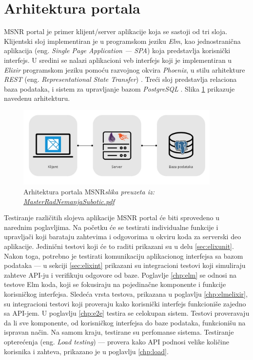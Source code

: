 \documentclass[12pt,oneside]{memoir}
\begin{document}
\section{Arhitektura portala}
\par MSNR portal je primer klijent/server aplikacije koja se sastoji od tri sloja. Klijentski sloj implementiran je u programskom jeziku \emph{Elm}, kao jednostranična aplikacija (eng. \emph{Single Page Application --- SPA}) koja predstavlja korisnički interfejs. U sredini se nalazi aplikacioni veb interfejs koji je implementiran u \emph{Elixir} programskom jeziku pomoću razvojnog okvira \emph{Phoenix}, u stilu arhitekture \emph{REST} (eng. \emph{Representational State Transfer}) \cite{rest}. Treći sloj predstavlja relaciona baza podataka, i sistem za upravljanje bazom \emph{PostgreSQL} \cite{postgre}. Slika \ref{fig:msnr-arch} prikazuje navedenu arhitekturu. 

\begin{figure}[!ht]
  \centering
  \label{fig:msnr-arch}
  \includegraphics[width=0.9\textwidth]{msnr-arch.png}
  \caption{Arhitektura portala MSNR\newline \tiny{\emph{slika preuzeta iz: \href{http://poincare.matf.bg.ac.rs/~milena/masteri/2022_NemanjaSubotic/MasterRadNemanjaSubotic.pdf}{MasterRadNemanjaSubotic.pdf}}}}
\end{figure}

\par Testiranje različitih slojeva aplikacije MSNR portal će biti sprovedeno u narednim poglavljima. Na početku će se testirati individualne funkcije i upravljači koji barataju zahtevima i odgovorima u okviru koda za serverski deo aplikacije. Jedinični testovi koji će to raditi prikazani su u delu \ref{sec:elixunit}. Nakon toga, potrebno je testirati komunikaciju aplikacionog interfejsa sa bazom podataka --- u sekciji \ref{sec:elixint} prikazani su integracioni testovi koji simuliraju zahteve API-ju i verifikuju odgovore od baze. Poglavlje \ref{chp:elm} se odnosi na testove Elm koda, koji se fokusiraju na pojedinačne komponente i funkcije korisničkog interfejsa. Sledeća vrsta testova, prikazana u poglavlju \ref{chp:elmelixir}, su integracioni testovi koji proveraju kako korisnički interfejs funkcioniše zajedno sa API-jem. U poglavlju \ref{chp:e2e} testira se celokupan sistem. Testovi proveravaju da li sve komponente, od korisničkog interfejsa do baze podataka, funkcionišu na ispravan način. Na samom kraju, testirane su perfomanse sistema. Testiranje opterećenja (eng. \emph{Load testing}) --- provera kako API podnosi velike količine korisnika i zahteva, prikazano je u poglavlju \ref{chp:load}.
\end{document}
